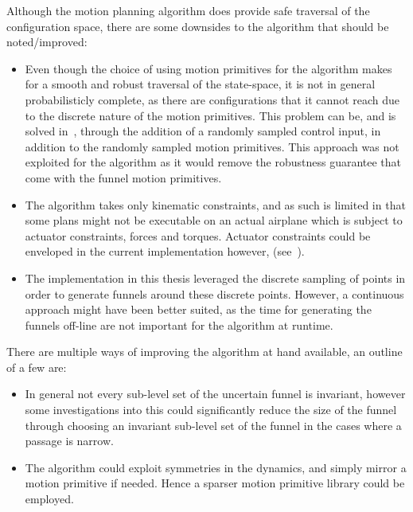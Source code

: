 Although the \rrtfunnel{} motion planning algorithm does provide safe traversal
of the configuration space, there are some downsides to the algorithm that
should be noted/improved:
\begin{itemize}

\item Even though the choice of using motion primitives for the \rrtfunnel{}
  algorithm makes for a smooth and robust traversal of the state-space, it is
  not in general probabilisticly complete, as there are configurations that it
  cannot reach due to the discrete nature of the motion primitives. This problem
  can be, and is solved in~\cite{vonasekGlobalMotionPlanning2013}, through the
  addition of a randomly sampled control input, in addition to the randomly
  sampled motion primitives. This approach was not exploited for the
  \rrtfunnel{} algorithm as it would remove the robustness guarantee that come
  with the funnel motion primitives.

\item The algorithm takes only kinematic constraints, and as such is limited in
  that some plans might not be executable on an actual airplane which is subject
  to actuator constraints, forces and torques. Actuator constraints could be
  enveloped in the current implementation however,
  (see~\cite[sec.4.3.3]{majumdarFunnelLibrariesRealtime2017}).

\item The implementation in this thesis leveraged the discrete sampling of
  points in order to generate funnels around these discrete points. However, a
  continuous approach might have been better suited, as the time for generating
  the funnels off-line are not important for the algorithm at runtime.

\end{itemize}

There are multiple ways of improving the algorithm at hand available, an outline
of a few are:

\begin{itemize}

  \item In general not every sub-level set of the uncertain funnel is invariant,
  however some investigations into this could significantly reduce the size of
  the funnel through choosing an invariant sub-level set of the funnel in the
  cases where a passage is narrow.

\item The algorithm could exploit symmetries in the dynamics, and simply mirror
  a motion primitive if needed. Hence a sparser motion primitive library could
  be employed.

\end{itemize}



